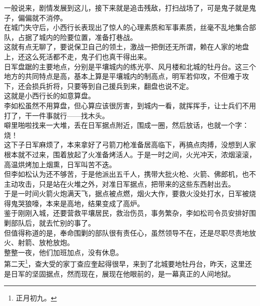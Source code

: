 \begin{multicols}{\theparacolNo}
一般说来，剧情发展到这儿，接下来就是追击残敌，打扫战场了，可是鬼子就是鬼子，偏偏就不消停。\\

在城门失守后，小西行长表现出了惊人的心理素质和军事素质，丝毫不乱地集合部队，占据了城内的险要位置，准备打巷战。\\

这就有点无聊了，要说保卫自己的领土，激战一把倒还无所谓，赖在人家的地盘上，还这么死活都不走，鬼子们也真干得出来。\\

日军盘踞的主要地点，分别是平壤城内的练光亭、风月楼和北城的牡丹台。这三个地方的共同特点是高，基本上算是平壤城内的制高点，明军若仰攻，不但难于攻下，还会损兵折将，只要等到自己援兵到来，翻盘也说不定。\\

这就是小西行长的如意算盘。\\

李如松虽然不用算盘，但心算应该很厉害，到城内一看，就挥挥手，让士兵们不用打了，干一件事就行——找木头。\\

噼里啪啦找来一大堆，丢在日军据点附近，围成一圈，然后放话，也就一个字：烧！\\

这下子日军麻烦了，本来拿好了弓箭刀枪准备居高临下，再搞点肉搏，没想到人家根本就不过来，围着放起了火准备烤活人。于是一时之间，火光冲天，浓烟滚滚，高温烘烤加上烟熏，日军叫苦不迭。\\

但李如松认为还不够苦，于是他派出五千人，携带大批火枪、火箭、佛郎机，也不主动攻击，只是站在火堆之外，对准日军据点，把带来的这些东西射出去。\\

于是一时间火箭火炮满天飞，据点被点燃，烟火大作，要救火没处打水，日军被烧得鬼哭狼嚎，本来是高地，结果变成了高炉。\\

鉴于刚刚入城，还要营救平壤居民，救治伤员，事务繁杂，李如松司令员安排好围剿部队后，就去忙别的事了。\\

但值得称道的是，奉命围剿的部队很有责任心，虽然领导不在，还是尽职尽责地放火、射箭、放枪放炮。\\

整整一夜，他们加班加点，没有休息。\\

第二天\footnote{正月初九。}，查大受的家丁查应奎起得很早，来到了北城要地牡丹台，昨天，这里还是日军的坚固据点，然而现在，展现在他眼前的，是一幕真正的人间地狱。\\


\end{multicols}
